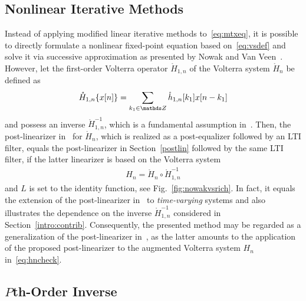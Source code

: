 \documentclass[10pt,twocolumn,twoside]{IEEEtran}
\begin{document}
\subsection{Nonlinear Iterative Methods}

Instead of applying modified linear iterative methods to~\eqref{eq:mtxeq},
it is possible to directly formulate a nonlinear fixed-point equation
based on~\eqref{eq:vsdef} and solve it via successive approximation as
presented by Nowak and Van Veen~\cite{nowak1997}. However, let the
first-order Volterra operator $\mathring{H}_{1,n}$
of the Volterra system $\mathring{H}_n$ be defined as
\begin{align*}
	\mathring{H}_{1,n}\{x[n]\} = \sum_{k_1\in\Z} \mathring{h}_{1,n}[k_1] x[n-k_1]
\end{align*}
and possess an inverse $\mathring{H}^{-1}_{1,n}$,
which is a fundamental assumption in~\cite{nowak1997}.
Then, the post-linearizer in~\cite{nowak1997} for $\mathring{H}_n$, which is realized as a
post-equalizer followed by an LTI filter, equals
the post-linearizer in Section~\ref{postlin} followed by the same LTI filter,
if the latter linearizer is based on the Volterra system
\begin{align}
	H_n = \mathring{H}_n \circ \mathring{H}^{-1}_{1,n}
	\label{eq:hncheck}
\end{align}
and $L$ is set to the identity function, see Fig.~\ref{fig:nowakvsrich}.
In fact, it equals the extension of the post-linearizer in~\cite{nowak1997}
to \emph{time-varying} systems and also illustrates the dependence on the inverse
$\mathring{H}^{-1}_{1,n}$ considered in Section~\ref{intro:contrib}.
Consequently, the presented method may be regarded as a generalization
of the post-linearizer in~\cite{nowak1997}, as the latter amounts to the application
of the proposed post-linearizer to the augmented Volterra system $H_n$ in~\eqref{eq:hncheck}.

\subsection{$P$th-Order Inverse}
\end{document}
